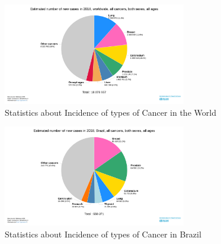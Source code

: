 \documentclass[conference]{IEEEtran}
\begin{document}
\begin{figure}[h]
    \centering
    \includegraphics[width=8cm]{images/graphic1.png}
    \caption{Statistics about Incidence of types of Cancer in the World \cite{GLOBOCAN}}
    \label{fig:my_label}
\end{figure}

\begin{figure}[h]
    \centering
    \includegraphics[width=8cm]{images/graphic2.png}
    \caption{Statistics about Incidence of types of Cancer in Brazil \cite{GLOBOCAN}}
    \label{fig:my_label}
\end{figure}
\end{document}
